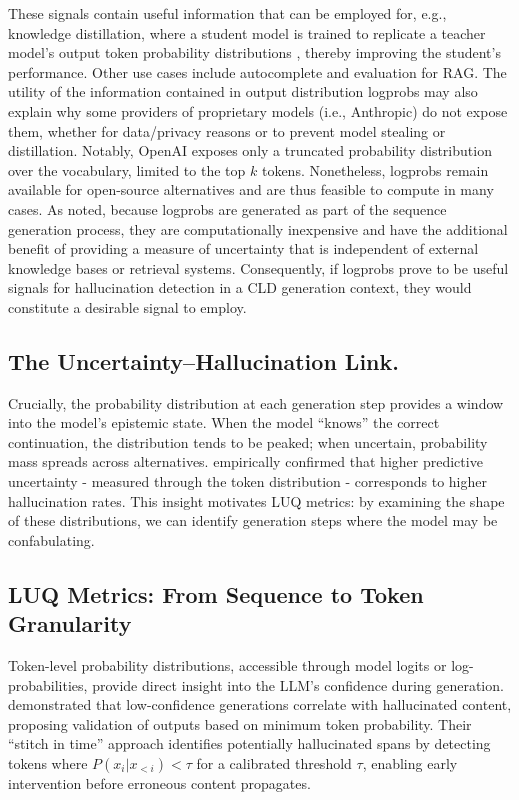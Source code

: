 These signals contain useful information that can be employed for, e.g., knowledge distillation, where a student model is trained to replicate a teacher model's output token probability distributions \citep{gu2023minillm}, thereby improving the student's performance. Other use cases include autocomplete and evaluation for RAG. The utility of the information contained in output distribution logprobs may also explain why some providers of proprietary models (i.e., Anthropic) do not expose them, whether for data/privacy reasons \citep{mattern2023membership} or to prevent model stealing \citep{carlini2024stealing} or distillation. Notably, OpenAI exposes only a truncated probability distribution over the vocabulary, limited to the top $k$ tokens. 
Nonetheless, logprobs remain available for open-source alternatives and are thus feasible to compute in many cases.
As noted, because logprobs are generated as part of the sequence generation process, they are computationally inexpensive and have the additional benefit of providing a measure of uncertainty that is independent of external knowledge bases or retrieval systems. Consequently, if logprobs prove to be useful signals for hallucination detection in a CLD generation context, they would constitute a desirable signal to employ.


\subsection{The Uncertainty--Hallucination Link.} Crucially, the probability distribution at each generation step provides a window into the model's epistemic state. When the model ``knows'' the correct continuation, the distribution tends to be peaked; when uncertain, probability mass spreads across alternatives. \citet{xiao-wang-2021-hallucination} empirically confirmed that higher predictive uncertainty - measured through the token distribution - corresponds to higher hallucination rates. This insight motivates LUQ metrics: by examining the shape of these distributions, we can identify generation steps where the model may be confabulating.

\subsection{LUQ Metrics: From Sequence to Token Granularity}

Token-level probability distributions, accessible through model logits or log-probabilities, provide direct insight into the LLM's confidence during generation. \citet{varshney2023stitch} demonstrated that low-confidence generations correlate with hallucinated content, proposing validation of outputs based on minimum token probability. Their ``stitch in time'' approach identifies potentially hallucinated spans by detecting tokens where $P(x_i | x_{<i}) < \tau$ for a calibrated threshold $\tau$, enabling early intervention before erroneous content propagates.

